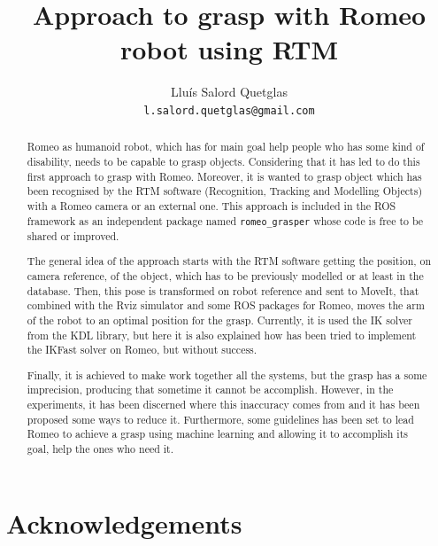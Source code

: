 \documentclass[12pt,a4paper,final,twoside,openright]{report}
\title{Approach to grasp with Romeo robot using RTM}
\author{Lluís Salord Quetglas\\
		\texttt{l.salord.quetglas@gmail.com}\\}
\date{Technischen Universität Wien (TU Wien)\\
Automation and Control Institute (ACIN)\\
\paragraph{} 
Master Thesis Project\\
\paragraph{}
\today} %
\begin{document}
\maketitle
\thispagestyle{empty}

\cleardoublepage


\begin{abstract}

Romeo as humanoid robot, which has for main goal help people who has some kind of disability, needs to be capable to grasp objects. Considering that it has led to do this first approach to grasp with Romeo. Moreover, it is wanted to grasp object which has been recognised by the RTM software (Recognition, Tracking and Modelling Objects) with a Romeo camera or an external one. This approach is included in the ROS framework as an independent package named \texttt{romeo\_grasper} whose code is free to be shared or improved.

The general idea of the approach starts with the RTM software getting the position, on camera reference, of the object, which has to be previously modelled or at least in the database. Then, this pose is transformed on robot reference and sent to MoveIt, that combined with the Rviz simulator and some ROS packages for Romeo, moves the arm of the robot to an optimal position for the grasp. Currently, it is used the IK solver from the KDL library, but here it is also explained how has been tried to implement the IKFast solver on Romeo, but without success.

Finally, it is achieved to make work together all the systems, but the grasp has a some imprecision, producing that sometime it cannot be accomplish. However, in the experiments, it has been discerned where this inaccuracy comes from and it has been proposed some ways to reduce it. Furthermore, some guidelines has been set to lead Romeo to achieve a grasp using machine learning and allowing it to accomplish its goal, help the ones who need it.


\end{abstract}

\tableofcontents
\newpage
\listoffigures
\newpage
\listoftables
\newpage

\chapter*{Acknowledgements}
\end{document}
